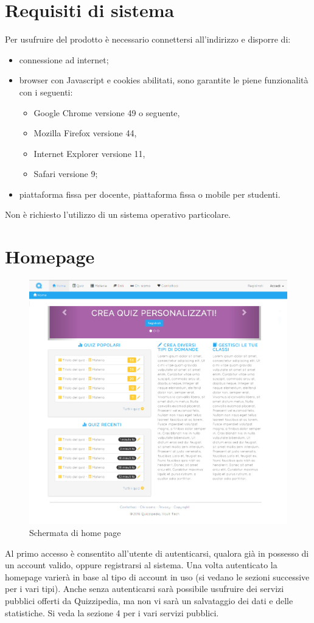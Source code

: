 \documentclass[a4paper, titlepage]{article}
\begin{document}
	\section{Requisiti di sistema}
	Per usufruire del prodotto è necessario connettersi all'indirizzo  e disporre di:
	\begin{itemize}
		\item connessione ad internet;
		\item browser con Javascript e cookies abilitati, sono garantite le piene funzionalità con i seguenti:
		\begin{itemize}
			\item Google Chrome versione 49 o seguente,
			\item Mozilla Firefox versione 44,
			\item Internet Explorer versione 11,
			\item Safari versione 9;
		\end{itemize}
		\item piattaforma fissa per docente, piattaforma fissa o mobile per studenti.
	\end{itemize}
	Non è richiesto l’utilizzo di un sistema operativo particolare.
	
	\newpage
	\section{Homepage}
	\begin{figure}[!h]
		\centering
		\includegraphics[scale=0.33]{Img/screen_HomepageGenerica.png}
		\caption{Schermata di home page}
	\end{figure}
	Al primo accesso è consentito all'utente di autenticarsi, qualora già in possesso di un account valido, oppure registrarsi al sistema. Una volta autenticato la homepage varierà in base al tipo di account in uso (si vedano le sezioni successive per i vari tipi). 
	Anche senza autenticarsi sarà possibile usufruire dei servizi pubblici offerti da Quizzipedia, ma non vi sarà un salvataggio dei dati e delle statistiche. Si veda la sezione 4 per i vari servizi pubblici.
	
\end{document}
